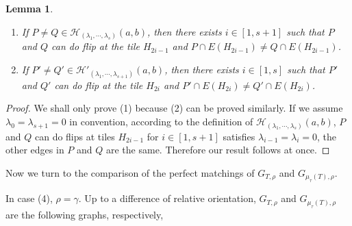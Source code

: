 \documentclass[10pt]{amsart}
\theoremstyle{theorems}
\newtheorem{Lemma}[Theorem]{Lemma}
\begin{document}
\medskip

\begin{Lemma}\label{diff}
\begin{enumerate}[$(1)$]

  \item If $P\neq Q\in \mathcal H_{(\lambda_1,\cdots,\lambda_s)}(a,b)$, then there exists $i\in [1,s+1]$ such that $P$ and $Q$ can do flip at the tile $H_{2i-1}$ and $P\cap E(H_{2i-1})\neq Q\cap E(H_{2i-1})$.

  \item If $P'\neq Q'\in \mathcal H'_{(\lambda_1,\cdots,\lambda_{s+1})}(a,b)$, then there exists $i\in [1,s]$ such that $P'$ and $Q'$ can do flip at the tile $H_{2i}$ and $P'\cap E(H_{2i})\neq Q'\cap E(H_{2i})$.

\end{enumerate}

\end{Lemma}

\begin{proof}

We shall only prove (1) because (2) can be proved similarly. If we assume $\lambda_0=\lambda_{s+1}=0$ in convention, according to the definition of $\mathcal H_{(\lambda_1,\cdots,\lambda_s)}(a,b)$, $P$ and $Q$ can do flips at tiles $H_{2i-1}$ for $i\in [1,s+1]$ satisfies $\lambda_{i-1}=\lambda_i=0$, the other edges in $P$ and $Q$ are the same. Therefore our result follows at once.
\end{proof}

\medskip

Now we turn to the comparison of the perfect matchings of $G_{T,\rho}$ and $G_{\mu_{\tau}(T),\rho}$.

\medskip

In case (4), $\rho=\gamma$. Up to a difference of relative orientation, $G_{T,\rho}$ and $G_{\mu_{\tau}(T),\rho}$ are the following graphs, respectively,
\end{document}
